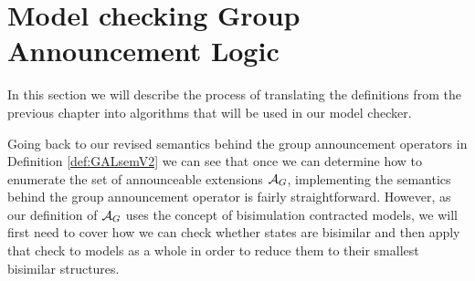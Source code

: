 \section{Model checking Group Announcement Logic}\label{sec:algorithms}

In this section we will describe the process of translating the definitions from the previous chapter into algorithms that will be used in our model checker. 


Going back to our revised semantics behind the group announcement operators in Definition \ref{def:GALsemV2} we can see that once we can determine how to enumerate the set of announceable extensions $\mathcal{A}_{G}$, implementing the semantics behind the group announcement operator is fairly straightforward. However, as our definition of $\mathcal{A}_{G}$ uses the concept of bisimulation contracted models, we will first need to cover how we can check whether states are bisimilar and then apply that check to models as a whole in order to reduce them to their smallest bisimilar structures. 


